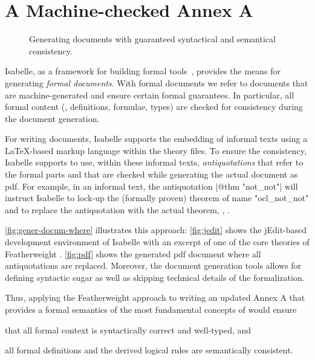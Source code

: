 \section{A Machine-checked Annex A}
\begin{figure*}[tb]
  \mbox{}\hfill
  \hfill%
  \hfill%
    \hfill\mbox{}
  \caption{Generating documents with guaranteed  syntactical and
    semantical consistency.}
  \label{fig:gener-docum-where}
\end{figure*}
Isabelle, as a framework for building formal
tools~\cite{wenzel.ea:building:2007}, provides the means for
generating \emph{formal documents}.
With formal documents we refer to documents that are machine-generated
and ensure certain formal guarantees. In particular, all formal
content (\eg, definitions, formulae, types) are checked for
consistency during the document generation.

For writing documents, Isabelle supports the embedding of informal
texts using a \LaTeX-based markup language within the theory files. To
ensure the consistency, Isabelle supports to use, within these
informal texts, \emph{antiquotations} that refer to the formal parts and
that are checked while generating the actual document as
\acs{pdf}. For example, in an informal text, the antiquotation
\inlineisar|@{$\text{thm}$ "not_not"}| will instruct Isabelle to lock-up the
(formally proven) theorem of name \inlineisar"ocl_not_not" and to replace
the antiquotation with the actual theorem, \ie,
.

\autoref{fig:gener-docum-where}
illustrates this approach: \autoref{fig:jedit} shows the jEdit-based
development environment of Isabelle with an excerpt of one of the core
theories of Featherweight \OCL. \autoref{fig:pdf} shows the generated
\acs{pdf} document where all antiquotations are replaced. Moreover,
the document generation tools allows for defining syntactic sugar as
well as skipping technical details of the formalization.


Thus, applying the Featherweight \OCL approach to writing an updated
Annex A that provides a formal semantics of the most fundamental
concepts of \OCL would ensure
\begin{inparaenum}
\item that all formal context is syntactically correct and well-typed,
  and
\item all formal definitions and the derived logical rules are
  semantically consistent.
\end{inparaenum}
